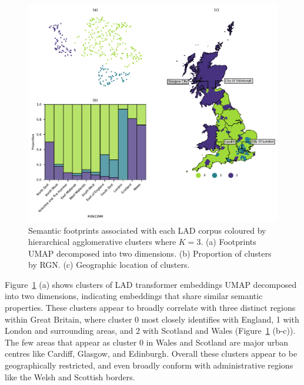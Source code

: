 \documentclass[
  letterpaper,
  11pt,
  english,
  onehalfspacing,
  headsepline]{MastersDoctoralThesis}
\begin{document}
\begin{figure}

{\centering \includegraphics{05_footprint/05_figures/fig-clusters-output-1.pdf}

}

\caption{\label{fig-clusters}Semantic footprints associated with each
LAD corpus coloured by hierarchical agglomerative clusters where
\(K=3\). (a) Footprints UMAP decomposed into two dimensions. (b)
Proportion of clusters by RGN. (c) Geographic location of clusters.}

\end{figure}

Figure~\ref{fig-clusters} (a) shows clusters of LAD transformer
embeddings UMAP decomposed into two dimensions, indicating embeddings
that share similar semantic properties. These clusters appear to broadly
correlate with three distinct regions within Great Britain, where
cluster 0 most closely identifies with England, 1 with London and
surrounding areas, and 2 with Scotland and Wales
(Figure~\ref{fig-clusters} (b-c)). The few areas that appear as cluster
0 in Wales and Scotland are major urban centres like Cardiff, Glasgow,
and Edinburgh. Overall these clusters appear to be geographically
restricted, and even broadly conform with administrative regions like
the Welsh and Scottish borders.
\end{document}
